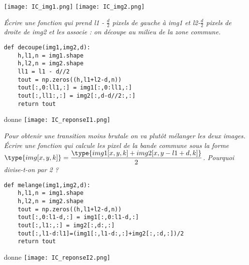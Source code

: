 \begin{center}
\texttt{[image: IC\_img1.png]} 
\hskip 1cm
\texttt{[image: IC\_img2.png]} 
\end{center}
\begin{Exercise}\it 
Écrire une fonction  qui prend l1 - $\frac d 2$ pixels de gauche à img1 et l2-$\frac d 2$  pixels de droite de img2 et les associe : on découpe au milieu de la zone commune.
\end{Exercise}
\begin{Answer}
\begin{lstlisting}
def decoupe(img1,img2,d):
    h,l1,n = img1.shape
    h,l2,n = img2.shape
    ll1 = l1 - d//2
    tout = np.zeros((h,l1+l2-d,n))
    tout[:,0:ll1,:] = img1[:,0:ll1,:]
    tout[:,ll1:,:] = img2[:,d-d//2:,:]
    return tout
\end{lstlisting}
\end{Answer}
\begin{center}
 donne
\texttt{[image: IC\_reponseI1.png]} 
\end{center}
\begin{Exercise}\it 
Pour obtenir une transition moins brutale on va plutôt mélanger les deux images.
Écrire une fonction  qui calcule les pixel de la bande commune sous la forme $\displaystyle \type{img[x,y,k]} = \frac{\type{img1[x,y,k] + img2[x,y - l1 + d,k]}}2$.
Pourquoi divise-t-on par 2 ?
\end{Exercise}
\begin{Answer}
\begin{lstlisting}
def melange(img1,img2,d):
    h,l1,n = img1.shape
    h,l2,n = img2.shape
    tout = np.zeros((h,l1+l2-d,n))
    tout[:,0:l1-d,:] = img1[:,0:l1-d,:]
    tout[:,l1:,:] = img2[:,d:,:]
    tout[:,l1-d:l1]=(img1[:,l1-d:,:]+img2[:,:d,:])/2
    return tout
\end{lstlisting}
\end{Answer}
\begin{center}
 donne \texttt{[image: IC\_reponseI2.png]} 
\end{center}
